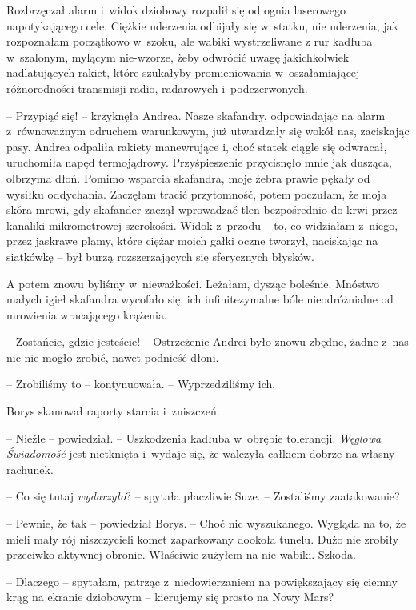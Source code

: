 \documentclass[oneside,polish,11pt,sfheadings]{mwbk}
\begin{document}
Rozbrzęczał alarm i~widok dziobowy rozpalił się od ognia laserowego
napotykającego cele. Ciężkie uderzenia odbijały się w~statku, nie
uderzenia, jak rozpoznałam początkowo w~szoku, ale wabiki wystrzeliwane
z rur kadłuba w~szalonym, mylącym nie-wzorze, żeby odwrócić uwagę
jakichkolwiek nadlatujących rakiet, które szukałyby promieniowania w~oszałamiającej różnorodności transmisji radio, radarowych i~podczerwonych.

-- Przypiąć się! -- krzyknęła Andrea. Nasze skafandry, odpowiadając na
alarm z~równoważnym odruchem warunkowym, już utwardzały się wokół nas,
zaciskając pasy. Andrea odpaliła rakiety manewrujące i, choć statek
ciągle się odwracał, uruchomiła napęd termojądrowy. Przyśpieszenie
przycisnęło mnie jak dusząca, olbrzyma dłoń. Pomimo wsparcia skafandra,
moje żebra prawie pękały od wysiłku oddychania. Zaczęłam tracić
przytomność, potem poczułam, że moja skóra mrowi, gdy skafander zaczął
wprowadzać tlen bezpośrednio do krwi przez kanaliki mikrometrowej
szerokości. Widok z~przodu -- to, co widziałam z~niego, przez jaskrawe
plamy, które ciężar moich gałki oczne tworzył, naciskając na siatkówkę -- był burzą rozszerzających się sferycznych błysków.

A potem znowu byliśmy w~nieważkości. Leżałam, dysząc boleśnie. Mnóstwo
małych igieł skafandra wycofało się, ich infinitezymalne bóle
nieodróżnialne od mrowienia wracającego krążenia.

-- Zostańcie, gdzie jesteście! -- Ostrzeżenie Andrei było znowu zbędne,
żadne z~nas nic nie mogło zrobić, nawet podnieść dłoni. 

-- Zrobiliśmy to -- kontynuowała. -- Wyprzedziliśmy ich.

Borys skanował raporty starcia i~zniszczeń.

-- Nieźle -- powiedział. -- Uszkodzenia kadłuba w~obrębie tolerancji.
\textit{Węglowa Świadomość} jest nietknięta i~wydaje się, że walczyła
całkiem dobrze na własny rachunek.

-- Co się tutaj \textit{wydarzyło}? -- spytała płaczliwie Suze. -- Zostaliśmy
zaatakowanie?

-- Pewnie, że tak -- powiedział Borys. -- Choć nic wyszukanego. Wygląda na
to, że mieli mały rój niszczycieli komet zaparkowany dookoła tunelu.
Dużo nie zrobiły przeciwko aktywnej obronie. Właściwie zużyłem na nie
wabiki. Szkoda.

-- Dlaczego -- spytałam, patrząc z~niedowierzaniem na powiększający się
ciemny krąg na ekranie dziobowym -- kierujemy się prosto na Nowy Mars?
\end{document}
